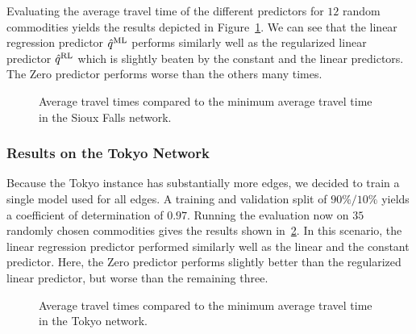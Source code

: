 Evaluating the average travel time of the different predictors for $12$ random commodities yields the results depicted in Figure~\ref{fig:sioux-falls-boxplot}.
We can see that the linear regression predictor $\hat q^{\text{ML}}$ performs similarly well as the regularized linear predictor $\hat q^{\text{RL}}$ which is slightly beaten by the constant and the linear predictors.
The Zero predictor performs worse than the others many times.


\begin{figure}[ht]
    \centering
    
    \caption{Average travel times compared to the minimum average travel time in the Sioux Falls network.}
    \label{fig:sioux-falls-boxplot}
\end{figure}



\subsubsection*{Results on the Tokyo Network}

Because the Tokyo instance has substantially more edges, we decided to train a single model used for all edges.
A training and validation split of $90\%/10\%$ yields a coefficient of determination of $0{.}97$.
Running the evaluation now on $35$ randomly chosen commodities gives the results shown in~\ref{fig:tokyo-boxplot}.
In this scenario, the linear regression predictor performed similarly well as the linear and the constant predictor.
Here, the Zero predictor performs slightly better than the regularized linear predictor, but worse than the remaining three.


\begin{figure}[ht]
    \centering
    
    \caption{Average travel times compared to the minimum average travel time in the Tokyo network.}
    \label{fig:tokyo-boxplot}
\end{figure}
